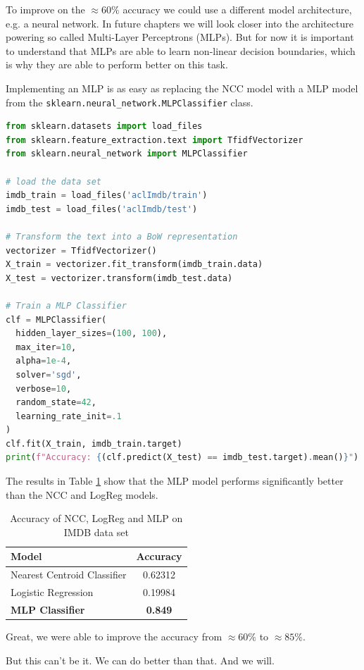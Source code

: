 To improve on the $\approx 60\%$ accuracy we could use a different model architecture, e.g. a neural network.
In future chapters we will look closer into the architecture powering so called Multi-Layer Perceptrons (MLPs).
But for now it is important to understand that MLPs are able to learn non-linear decision boundaries, which is why they are able to perform better on this task.

Implementing an MLP is as easy as replacing the NCC model with a MLP model from the \lstinline{sklearn.neural_network.MLPClassifier} class.
\begin{lstlisting}[language=Python, caption={IMDB example with MLP}, label={code:imdb-mlp}]
from sklearn.datasets import load_files
from sklearn.feature_extraction.text import TfidfVectorizer
from sklearn.neural_network import MLPClassifier

# load the data set
imdb_train = load_files('aclImdb/train')
imdb_test = load_files('aclImdb/test')

# Transform the text into a BoW representation
vectorizer = TfidfVectorizer()
X_train = vectorizer.fit_transform(imdb_train.data)
X_test = vectorizer.transform(imdb_test.data)

# Train a MLP Classifier
clf = MLPClassifier(
  hidden_layer_sizes=(100, 100),
  max_iter=10,
  alpha=1e-4,
  solver='sgd',
  verbose=10,
  random_state=42,
  learning_rate_init=.1
)
clf.fit(X_train, imdb_train.target)
print(f"Accuracy: {(clf.predict(X_test) == imdb_test.target).mean()}")
\end{lstlisting}
The results in Table \ref{tab:imdb-mlp} show that the MLP model performs significantly better than the NCC and LogReg models.

\begin{table}[h]
  \centering
  \begin{tabular}{|l|c|}
    \hline
    \textbf{Model} & \textbf{Accuracy} \\
    \hline
    Nearest Centroid Classifier & 0.62312\\
    Logistic Regression & 0.19984\\
    \textbf{MLP Classifier} & \textbf{0.849}\\
    \hline
  \end{tabular}
  \caption{Accuracy of NCC, LogReg and MLP on IMDB data set}
  \label{tab:imdb-mlp}
\end{table}
Great, we were able to improve the accuracy from $\approx 60\%$ to $\approx 85\%$.

But this can't be it. We can do better than that. And we will.

